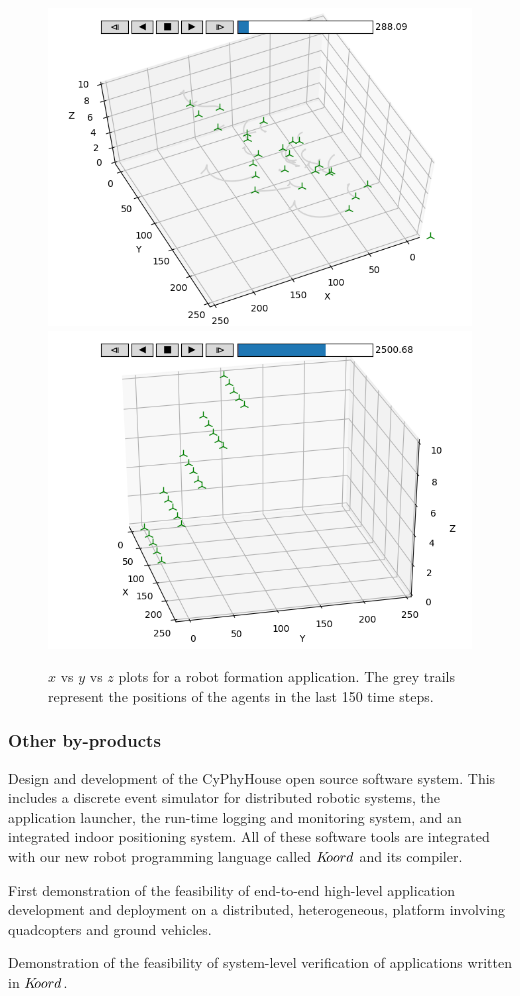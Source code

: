 \begin{figure}[h!]
\begin{minipage}{0.5\textwidth}
\includegraphics[width=.5\textwidth]{figs/formation1.png}\hfill
\includegraphics[width=.5\textwidth]{figs/formation5.png}\hfill%
\end{minipage}%
\caption{$x$ vs $y$ vs $z$ plots for a robot formation application. The grey trails represent the positions of the agents in the last 150 time steps.}
\label{fig:shapeformplots1}
\end{figure}


\subsubsection{Other by-products}


Design and development of the CyPhyHouse open source software system. This includes a discrete event simulator for distributed robotic systems, the application launcher, the run-time logging and monitoring system, and an integrated indoor positioning system. All of these software tools are integrated with our new robot programming language called $K\kern-2pt oord$ and its compiler. 

 First demonstration of the feasibility of end-to-end high-level application development and deployment on a distributed, heterogeneous, platform involving quadcopters and ground vehicles. 

 Demonstration of the feasibility of system-level verification of applications written in $K\kern-2pt oord$. 

